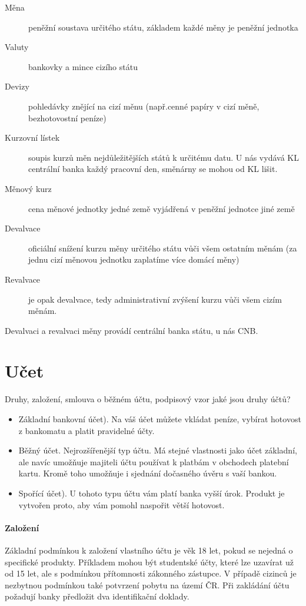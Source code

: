 \begin{description}
    \item[Měna] peněžní soustava určitého státu, základem každé měny je peněžní jednotka
    \item[Valuty] bankovky a mince cizího státu
    \item[Devizy] pohledávky znějící na cizí měnu (např.cenné papíry v cizí měně, bezhotovostní peníze)
    \item[Kurzovní lístek] soupis kurzů měn nejdůležitějších států k určitému datu. U nás vydává KL centrální banka každý pracovní den, směnárny se mohou od KL lišit.
    \item[Měnový kurz] cena měnové jednotky jedné země vyjádřená v peněžní jednotce jiné země
    \item[Devalvace] oficiální snížení kurzu měny určitého státu vůči všem ostatním měnám (za jednu cizí měnovou jednotku zaplatíme více domácí měny)
    \item[Revalvace] je opak devalvace, tedy administrativní zvýšení kurzu vůči všem cizím měnám.
\end{description}

Devalvaci a revalvaci měny provádí centrální banka státu, u nás CNB.

\section*{Učet}

Druhy, založení, smlouva o běžném účtu, podpisový vzor jaké jsou druhy účtů?
\begin{itemize}
    \item Základní bankovní účet). Na váš účet můžete vkládat peníze, vybírat hotovost z bankomatu a platit pravidelné účty.
    \item Běžný účet. Nejrozšířenější typ účtu. Má stejné vlastnosti jako účet základní, ale navíc umožňuje majiteli účtu používat k platbám v obchodech platební kartu. Kromě toho umožňuje i sjednání dočasného úvěru s vaší bankou.
    \item Spořící účet). U tohoto typu účtu vám platí banka vyšší úrok. Produkt je vytvořen proto, aby vám pomohl naspořit větší hotovost.
\end{itemize}

\paragraph{Založení}

Základní podmínkou k založení vlastního účtu je věk 18 let, pokud se nejedná o specifické produkty. Příkladem mohou být studentské účty, které lze uzavírat už od 15 let, ale s podmínkou přítomnosti zákonného zástupce. V případě cizinců je nezbytnou podmínkou také potvrzení pobytu na území ČR. Při zakládání účtu požadují banky předložit dva identifikační doklady.

